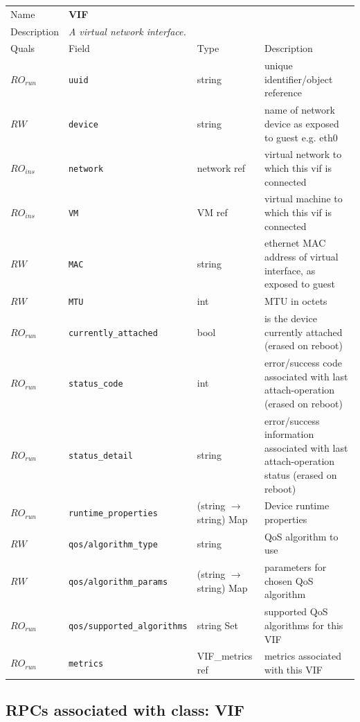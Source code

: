 \begin{longtable}{|lllp{}|}
\hline
\multicolumn{1}{|l}{Name} & \multicolumn{3}{l|}{\bf VIF} \\
\multicolumn{1}{|l}{Description} & \multicolumn{3}{l|}{\parbox{11cm}{\em A
virtual network interface.}} \\
\hline
Quals & Field & Type & Description \\
\hline
$\mathit{RO}_\mathit{run}$ &  {\tt uuid} & string & unique identifier/object reference \\
$\mathit{RW}$ &  {\tt device} & string & name of network device as exposed to guest e.g. eth0 \\
$\mathit{RO}_\mathit{ins}$ &  {\tt network} & network ref & virtual network to which this vif is connected \\
$\mathit{RO}_\mathit{ins}$ &  {\tt VM} & VM ref & virtual machine to which this vif is connected \\
$\mathit{RW}$ &  {\tt MAC} & string & ethernet MAC address of virtual interface, as exposed to guest \\
$\mathit{RW}$ &  {\tt MTU} & int & MTU in octets \\
$\mathit{RO}_\mathit{run}$ &  {\tt currently\_attached} & bool & is the device currently attached (erased on reboot) \\
$\mathit{RO}_\mathit{run}$ &  {\tt status\_code} & int & error/success code associated with last attach-operation (erased on reboot) \\
$\mathit{RO}_\mathit{run}$ &  {\tt status\_detail} & string & error/success information associated with last attach-operation status (erased on reboot) \\
$\mathit{RO}_\mathit{run}$ &  {\tt runtime\_properties} & (string $\rightarrow$ string) Map & Device runtime properties \\
$\mathit{RW}$ &  {\tt qos/algorithm\_type} & string & QoS algorithm to use \\
$\mathit{RW}$ &  {\tt qos/algorithm\_params} & (string $\rightarrow$ string) Map & parameters for chosen QoS algorithm \\
$\mathit{RO}_\mathit{run}$ &  {\tt qos/supported\_algorithms} & string Set & supported QoS algorithms for this VIF \\
$\mathit{RO}_\mathit{run}$ &  {\tt metrics} & VIF\_metrics ref & metrics associated with this VIF \\
\hline
\end{longtable}
\subsection{RPCs associated with class: VIF}
